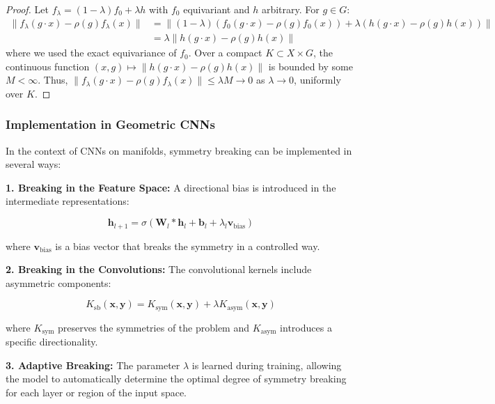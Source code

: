 \begin{proof}
Let $f_\lambda = (1-\lambda) f_0 + \lambda h$ with $f_0$ equivariant and $h$ arbitrary. For $g \in G$:
\begin{align}
\|f_\lambda(g \cdot x) - \rho(g) f_\lambda(x)\| &= \|(1-\lambda)(f_0(g \cdot x) - \rho(g) f_0(x)) + \lambda(h(g \cdot x) - \rho(g) h(x))\| \\
&= \lambda \|h(g \cdot x) - \rho(g) h(x)\|
\end{align}
where we used the exact equivariance of $f_0$. Over a compact $K \subset X \times G$, the continuous function $(x,g) \mapsto \|h(g \cdot x) - \rho(g) h(x)\|$ is bounded by some $M < \infty$. Thus, $\|f_\lambda(g \cdot x) - \rho(g) f_\lambda(x)\| \leq \lambda M \to 0$ as $\lambda \to 0$, uniformly over $K$.
\end{proof}

\subsubsection{Implementation in Geometric CNNs}

In the context of CNNs on manifolds, symmetry breaking can be implemented in several ways:

\textbf{1. Breaking in the Feature Space:} A directional bias is introduced in the intermediate representations:

\begin{equation}
\mathbf{h}_{l+1} = \sigma(\mathbf{W}_l * \mathbf{h}_l + \mathbf{b}_l + \lambda_l \mathbf{v}_{\text{bias}})
\end{equation}

where $\mathbf{v}_{\text{bias}}$ is a bias vector that breaks the symmetry in a controlled way.

\textbf{2. Breaking in the Convolutions:} The convolutional kernels include asymmetric components:

\begin{equation}
K_{\text{sb}}(\mathbf{x}, \mathbf{y}) = K_{\text{sym}}(\mathbf{x}, \mathbf{y}) + \lambda K_{\text{asym}}(\mathbf{x}, \mathbf{y})
\end{equation}

where $K_{\text{sym}}$ preserves the symmetries of the problem and $K_{\text{asym}}$ introduces a specific directionality.

\textbf{3. Adaptive Breaking:} The parameter $\lambda$ is learned during training, allowing the model to automatically determine the optimal degree of symmetry breaking for each layer or region of the input space.

